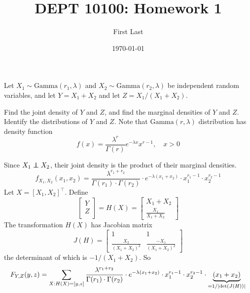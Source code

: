 \documentclass[10pt]{extarticle}
\title{DEPT 10100: Homework 1}
\author{First Last}
\date{\today}
\begin{document}
\begin{question}[10pts]
    Let $X_1 \sim \text{Gamma}(r_1, \lambda)$ and $X_2 \sim \text{Gamma}(r_2, \lambda)$ be independent random variables, and let $Y = X_1 + X_2$ and let $Z = X_1 / (X_1 + X_2)$.
\end{question}
Find the joint density of $Y$ and $Z$, and find the marginal densities of $Y$ and $Z$. Identify the distributions of $Y$ and $Z$. Note that $\text{Gamma}(r, \lambda)$ distribution has density function
    \begin{equation*}
        f(x)=\frac{\lambda^{r}}{\Gamma(r)} e^{-\lambda x} x^{r-1}, \quad x>0
    \end{equation*}

\begin{ans}
    Since $X_1 \perp \!\!\!\! \perp X_2$, their joint density is the product of their marginal densities.
    \begin{equation}
        f_{X_1, X_2}(x_1, x_2) = \frac{\lambda^{r_1 + r_2}}{\Gamma(r_1) \cdot \Gamma(r_2)}\cdot  e^{-\lambda(x_1 + x_2)} \cdot x_1^{r_1 - 1} \cdot x_2^{r_2 - 1}
    \end{equation}
    Let $X = [X_1, X_2]^\intercal$. Define
    \begin{equation}
        \begin{bmatrix}
            Y \\
            Z \\
        \end{bmatrix} = H(X) = \begin{bmatrix}
            X_1 + X_2 \\
            \frac{X_1}{X_1 + X_2}
        \end{bmatrix}
    \end{equation}
    The transformation $H(X)$ has Jacobian matrix
    \begin{equation}
        J(H) = \begin{bmatrix}
            1 & 1 \\
            \frac{X_2}{(X_1 + X_2)^2} & \frac{-X_1}{(X_1 + X_2)^2}
        \end{bmatrix}
    \end{equation}
    the determinant of which is $-1 / (X_1 + X_2)$. So
    \begin{align}
        F_{Y, Z}(y, z) &= \sum_{X : H(X) = [y, z]} \frac{\lambda^{r_1 + r_2}}{\Gamma(r_1) \cdot \Gamma(r_2)}\cdot  e^{-\lambda(x_1 + x_2)} \cdot x_1^{r_1 - 1} \cdot x_2^{r_2 - 1} \cdot \underbrace{(x_1 + x_2)}_{=1 / \abs{\det(J(H))}} \\

\end{align}
\end{ans}
\end{document}
